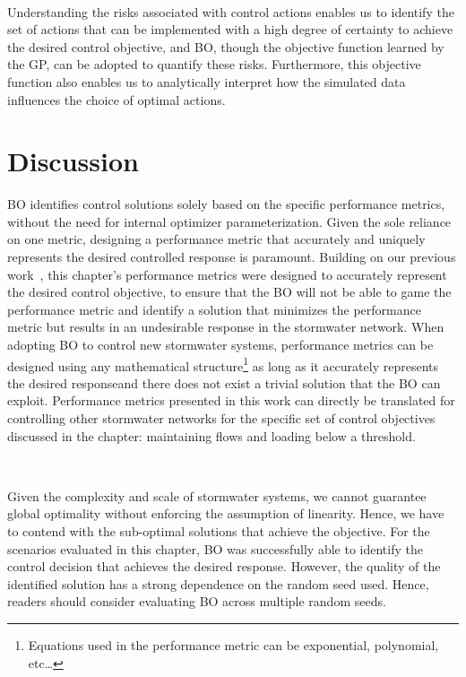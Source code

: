 \

Understanding the risks associated with control actions enables us to identify the set of actions that can be implemented with a high degree of certainty to achieve the desired control objective, and BO, though the objective function learned by the GP, can be adopted to quantify these risks. 
Furthermore, this objective function also enables us to analytically interpret how the simulated data influences the  choice of optimal actions.

\section{Discussion}
BO identifies control solutions solely based on the specific performance metrics, without the need for internal optimizer parameterization.
Given the sole reliance on one metric, designing a performance metric that accurately and uniquely represents the desired controlled response is paramount.
Building on our previous work~\cite{Mullapudi_Lewis_Gruden_Kerkez_2020}, this chapter's performance metrics were designed to accurately represent the desired control objective, to ensure that the BO will not be able to game the performance metric and identify a solution that minimizes the performance metric but results in an undesirable response in the stormwater network.
When adopting BO to control new stormwater systems, performance metrics can be designed using any mathematical structure\footnote{Equations used in the performance metric can be exponential, polynomial, etc\ldots} as long as it accurately represents the desired responseand there does not exist a trivial solution that the BO can exploit.
Performance metrics presented in this work can directly be translated for controlling other stormwater networks for the specific set of control objectives discussed in the chapter: maintaining flows and loading below a threshold.

\

Given the complexity and scale of stormwater systems, we cannot guarantee global optimality without enforcing the assumption of linearity. 
Hence, we have to contend with the sub-optimal solutions that achieve the objective. 
For the scenarios evaluated in this chapter, BO was successfully able to identify the control decision that achieves the desired response.
However, the quality of the identified solution has a strong dependence on the random seed used.
Hence, readers should consider evaluating BO across multiple random seeds.

